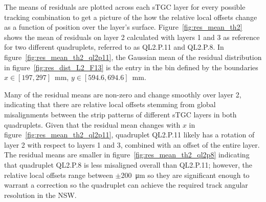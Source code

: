 The means of residuals are plotted across each sTGC layer for every possible tracking combination to get a picture of the how the relative local offsets change as a function of position over the layer's surface. Figure~\ref{fig:res_mean_th2} shows the mean of residuals on layer 2 calculated with layers 1 and 3 as reference for two different quadruplets, referred to as QL2.P.11 and QL2.P.8. In figure~\ref{fig:res_mean_th2_ql2p11}, the Gaussian mean of the residual distribution in figure~\ref{fig:res_dist_L2_F13} is the entry in the bin defined by the  boundaries $x\in\left[197, 297\right]$~mm,  $y\in\left[594.6, 694.6\right]$~mm.

Many of the residual means are non-zero and change smoothly over layer 2, indicating that there are relative local offsets stemming from global misalignments between the strip patterns of different sTGC layers in both quadruplets. Given that the residual mean changes with $x$ in figure~\ref{fig:res_mean_th2_ql2p11}, quadruplet QL2.P.11 likely has a rotation of layer 2 with respect to layers 1 and 3, combined with an offset of the entire layer. The residual means are smaller in figure~\ref{fig:res_mean_th2_ql2p8} indicating that quadruplet QL2.P.8 is less misaligned overall than QL2.P.11; however, the relative local offsets range between $\pm$\SI{200}{\micro\meter} so they are significant enough to warrant a correction so the quadruplet can achieve the required track angular resolution in the NSW.

